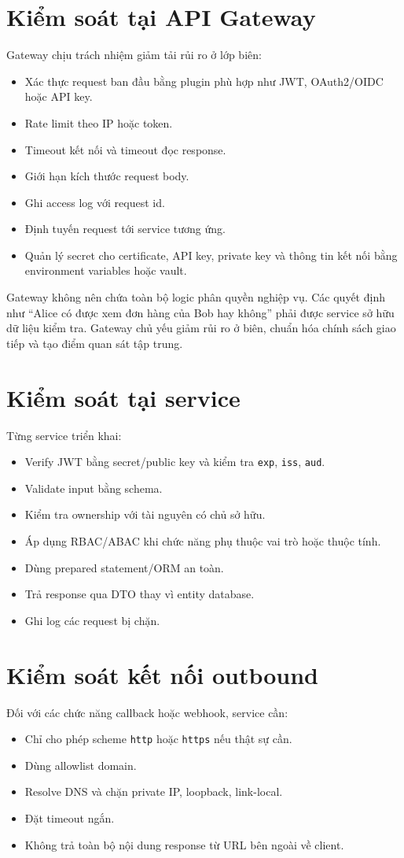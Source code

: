\documentclass[14pt,a4paper]{extreport}
\begin{document}
\section{Kiểm soát tại API Gateway}
Gateway chịu trách nhiệm giảm tải rủi ro ở lớp biên:
\begin{itemize}
  \item Xác thực request ban đầu bằng plugin phù hợp như JWT, OAuth2/OIDC hoặc API key.
  \item Rate limit theo IP hoặc token.
  \item Timeout kết nối và timeout đọc response.
  \item Giới hạn kích thước request body.
  \item Ghi access log với request id.
  \item Định tuyến request tới service tương ứng.
  \item Quản lý secret cho certificate, API key, private key và thông tin kết nối bằng environment variables hoặc vault.
\end{itemize}

Gateway không nên chứa toàn bộ logic phân quyền nghiệp vụ. Các quyết định như ``Alice có được xem đơn hàng của Bob hay không'' phải được service sở hữu dữ liệu kiểm tra. Gateway chủ yếu giảm rủi ro ở biên, chuẩn hóa chính sách giao tiếp và tạo điểm quan sát tập trung.

\section{Kiểm soát tại service}
Từng service triển khai:
\begin{itemize}
  \item Verify JWT bằng secret/public key và kiểm tra \texttt{exp}, \texttt{iss}, \texttt{aud}.
  \item Validate input bằng schema.
  \item Kiểm tra ownership với tài nguyên có chủ sở hữu.
  \item Áp dụng RBAC/ABAC khi chức năng phụ thuộc vai trò hoặc thuộc tính.
  \item Dùng prepared statement/ORM an toàn.
  \item Trả response qua DTO thay vì entity database.
  \item Ghi log các request bị chặn.
\end{itemize}

\section{Kiểm soát kết nối outbound}
Đối với các chức năng callback hoặc webhook, service cần:
\begin{itemize}
  \item Chỉ cho phép scheme \texttt{http} hoặc \texttt{https} nếu thật sự cần.
  \item Dùng allowlist domain.
  \item Resolve DNS và chặn private IP, loopback, link-local.
  \item Đặt timeout ngắn.
  \item Không trả toàn bộ nội dung response từ URL bên ngoài về client.
\end{itemize}
\end{document}
